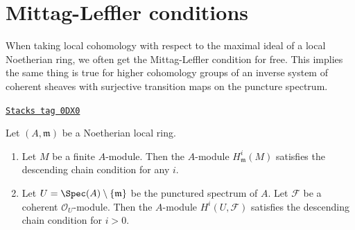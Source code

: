 \section{Mittag-Leffler conditions}
\label{algebraization-section-ML}
When taking local cohomology with respect to the maximal ideal
of a local Noetherian ring, we often get the Mittag-Leffler condition
for free. This implies the same thing is true for higher cohomology
groups of an inverse system of coherent sheaves with surjective transition
maps on the puncture spectrum.

\begin{lemma}
\label{algebraization-lemma-descending-chain}
\href{https://stacks.math.columbia.edu/tag/0DX0}{\texttt{Stacks tag 0DX0}}

Let $(A, \mathfrak m)$ be a Noetherian local ring.
\begin{enumerate}
\item Let $M$ be a finite $A$-module. Then the $A$-module
$H^i_\mathfrak m(M)$ satisfies the descending chain condition
for any $i$.
\item Let $U = \Spec(A) \setminus \{\mathfrak m\}$ be the
punctured spectrum of $A$.
Let $\mathcal{F}$ be a coherent $\mathcal{O}_U$-module.
Then the $A$-module $H^i(U, \mathcal{F})$
satisfies the descending chain condition for $i > 0$.
\end{enumerate}
\end{lemma}

